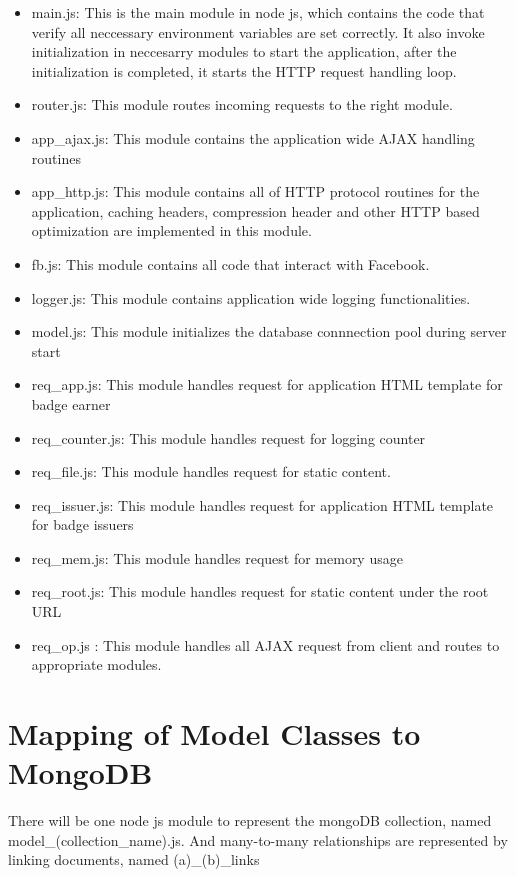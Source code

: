\begin{itemize}
\item main.js: This is the main module in node js, which contains the code that verify all neccessary environment variables are set correctly. It also invoke initialization in neccesarry modules to start the application, after the initialization is completed, it starts the HTTP request handling loop. 
\item router.js: This module routes incoming requests to the right module.
\item app{\_}ajax.js: This module contains the application wide AJAX handling routines
\item app{\_}http.js: This module contains all of HTTP protocol routines for the application, caching headers, compression header and other HTTP based optimization are implemented in this module.
\item fb.js: This module contains all code that interact with Facebook.
\item logger.js: This module contains application wide logging functionalities.
\item model.js: This module initializes the database connnection pool during server start 
\item req{\_}app.js: This module handles request for application HTML template for badge earner
\item req{\_}counter.js: This module handles request for logging counter 
\item req{\_}file.js: This module handles request for static content.
\item req{\_}issuer.js: This module handles request for application HTML template for badge issuers
\item req{\_}mem.js: This module handles request for memory usage
\item req{\_}root.js: This module handles request for static content under the root URL
\item req{\_}op.js : This module handles all AJAX request from client and routes to appropriate modules.  
\end{itemize}


\section{Mapping of Model Classes to MongoDB}
There will be one node js module to represent the mongoDB collection, named model{\_}(collection{\_}name).js. And many-to-many relationships are represented by linking documents, named (a){\_}(b){\_}links


